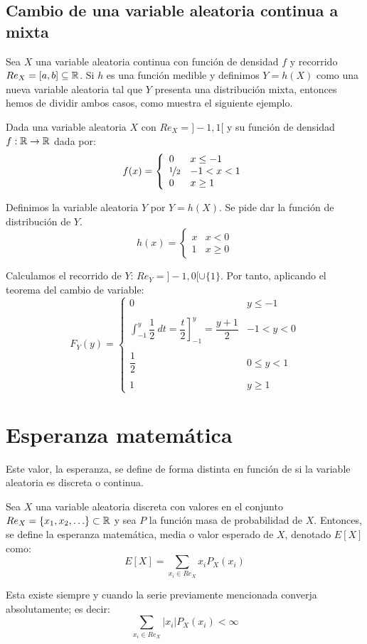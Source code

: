 \subsection{Cambio de una variable aleatoria continua a mixta}

Sea $X$ una variable aleatoria continua con función de densidad $f$ y recorrido $Re_X=[a,b]\subseteq \mathbb R$. Si $h$ es una función medible y definimos $Y=h(X)$ como una nueva variable aleatoria tal que $Y$ presenta una distribución mixta, entonces hemos de dividir ambos casos, como muestra el siguiente ejemplo.
\begin{ejemplo}
    Dada una variable aleatoria $X$ con $Re_X = ]-1, 1[$ y su función de densidad $f:\mathbb R \rightarrow \mathbb R$ dada por:
    $$f(x) = \left\{ \begin{array}{ll}
        0           & x \leq -1  \\
        \nicefrac{1}{2} & -1 < x < 1 \\
        0           & x \geq 1
    \end{array} \right. $$

    Definimos la variable aleatoria $Y$ por $Y=h(X)$. Se pide dar la función de distribución de $Y$.
    $$h(x) = \left\{ \begin{array}{ll}
        x & x < 0    \\
        1 & x \geq 0
    \end{array} \right.$$

        
    Calculamos el recorrido de $Y$: $Re_Y = ]-1, 0[ \cup \{1\}$. Por tanto, aplicando el teorema del cambio de variable:
    $$F_Y(y) = \left\{ \begin{array}{cl}
        0 & y \leq -1    \\ \\
        \displaystyle\int_{-1}^y \dfrac{1}{2}~dt = \left. \dfrac{t}{2} \right]_{-1}^y = \dfrac{y+1}{2} & -1 < y < 0   \\ \\
        \dfrac{1}{2} & 0 \leq y < 1 \\ \\
        1 & y \geq 1
  \end{array} \right.$$
\end{ejemplo}

\section{Esperanza matemática}

Este valor, la esperanza, se define de forma distinta en función de si la variable aleatoria es discreta o continua.
\begin{definicion}
    Sea $X$ una variable aleatoria discreta con valores en el conjunto $Re_X = \{x_1, x_2, \ldots\} \subset \mathbb R$ y sea $P$ la función masa de probabilidad de $X$. Entonces, se define la esperanza matemática, media o valor esperado de $X$, denotado $E[X]$ como:
    $$E[X] = \sum\limits_{x_i \in Re_X} x_i P_X(x_i)$$

    Esta existe siempre y cuando la serie previamente mencionada converja absolutamente; es decir:
    $$\sum\limits_{x_i \in Re_X} |x_i| P_X(x_i) < \infty$$
\end{definicion}

